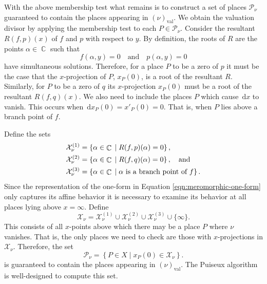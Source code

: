 \documentclass[12pt]{article}
\theoremstyle{definition}
\DeclareMathOperator{\CC}{\mathbb{C}}
\newcommand{\dx}{\,\mathrm{d}x}
\begin{document}
With the above membership test what remains is to construct a set of
places $\mathcal{P}_\nu$ guaranteed to contain the places appearing in
$(\nu)_\text{val}$. We obtain the valuation divisor by applying the
membership test to each $P \in \mathcal{P}_\nu$. Consider the resultant
$R(f,p)(x)$ of $f$ and $p$ with respect to $y$. By definition, the roots
of $R$ are the points $\alpha \in \CC$ such that
\begin{equation}
f(\alpha,y) = 0 \quad \text{and} \quad p(\alpha, y) = 0
\end{equation}
have simultaneous solutions. Therefore, for a place $P$ to be a zero of
$p$ it must be the case that the $x$-projection of $P$, $x_P(0)$, is a
root of the resultant $R$. Similarly, for $P$ to be a zero of $q$ its
$x$-projection $x_P(0)$ must be a root of the resultant $R(f,q)(x)$. We
also need to include the places $P$ which cause $\dx$ to vanish. This
occurs when $\dx_P(0) = x'_P(0) = 0$. That is, when $P$ lies above a
branch point of $f$.

Define the sets
\begin{align}
\mathcal{X}_\nu^{(1)} &=
\left\{
\alpha \in \CC \; | \; R(f,p)(\alpha) = 0
\right\}, \notag \\
\mathcal{X}_\nu^{(2)} &=
\left\{
\alpha \in \CC \; | \; R(f,q)(\alpha) = 0
\right\}, \quad \text{and} \notag \\
\mathcal{X}_\nu^{(3)} &= \left\{ \alpha \in \CC \; | \; \alpha \text{ is
  a branch point of $f$} \right\}.
\end{align}
Since the representation of the one-form in Equation
\eqref{eqn:meromorphic-one-form} only captures its affine behavior it is
necessary to examine its behavior at all places lying above
$x=\infty$. Define
\begin{equation}
\mathcal{X}_\nu
=
\mathcal{X}_\nu^{(1)} \cup
\mathcal{X}_\nu^{(2)} \cup
\mathcal{X}_\nu^{(3)} \cup
\{ \infty \}.
\end{equation}
This consists of all $x$-points above which there may be a place $P$
where $\nu$ vanishes. That is, the only places we need to check are
those with $x$-projections in $\mathcal{X}_\nu$. Therefore, the set
\begin{equation}
\mathcal{P}_\nu =
\left\{ P \in X \; | \; x_P(0) \in \mathcal{X}_\nu
\right\}.
\end{equation}
is guaranteed to contain the places appearing in $(\nu)_\text{val}$. The
Puiseux algorithm is well-designed to compute this set.
\end{document}
